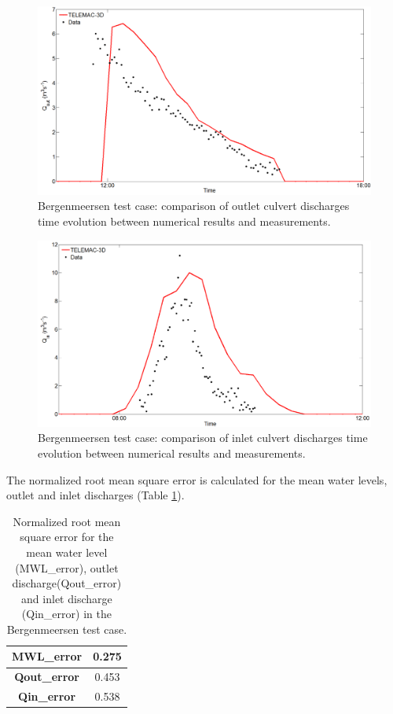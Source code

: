 \begin{figure}[H]
\begin{center}
  \includegraphics[scale=0.3]{figure7.png}
\end{center}
\caption{Bergenmeersen test case: comparison of outlet culvert discharges time evolution between numerical results and measurements.}
\label{fig:bergenmeersen_figure7}
\end{figure}
\begin{figure}[H]
\begin{center}
  \includegraphics[scale=0.3]{figure8.png}
\end{center}
\caption{Bergenmeersen test case: comparison of inlet culvert discharges time evolution between numerical results and measurements.}
\label{fig:bergenmeersen_figure8}
\end{figure}

The normalized root mean square error is calculated for the mean water levels, outlet and inlet discharges (Table \ref{tab:bergenmeersen_table3}). 

\begin{table}[H]
\caption{Normalized root mean square error for the mean water level (MWL\_error), 
outlet discharge(Qout\_error) and inlet discharge (Qin\_error) 
in the Bergenmeersen test case.}\label{tab:bergenmeersen_table3}
\begin{center}\begin{tabular}{|c|c|}
\hline
\textbf{MWL\_error} & 0.275\\
\hline
\textbf{Qout\_error} & 0.453 \\
\hline
\textbf{Qin\_error} & 0.538 \\
\hline
\end{tabular}\end{center}
\end{table}


